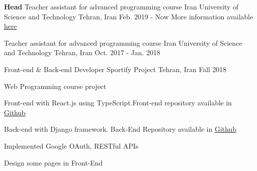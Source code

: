 

\begin{cventries}

  \cventry
  {\textbf{Head} Teacher assistant for advanced programming course} %
  {Iran University of Science and Technology} %
  {Tehran, Iran} %
  {Feb. 2019 - Now} %
  {More information available \textcolor{blue}{\href{https://sauleh.github.io/ap97/}{here}}}

  \cventry
  {Teacher assistant for advanced programming course} %
  {Iran University of Science and Technology} %
  {Tehran, Iran} %
  {Oct. 2017 - Jan. 2018} %
  {}

  \cventry
  {Front-end \& Back-end Developer} %
  {Sportify Project} %
  {Tehran, Iran} %
  {Fall 2018} %
  {
    \begin{cvitems} %
      \item {Web Programming course project}
      \item {Front-end with React.js using TypeScript.Front-end repository available in \href{https://github.com/ali4heydari/sportify-frontend}{Github}}
      \item {Back-end with Django framework. Back-End Repository available in \href{https://github.com/ali4heydari/sportify-backend}{Github}}
      \item {Implemented Google OAuth, RESTful APIs}
      \item {Design some pages in Front-End}
    \end{cvitems}
  }
  


\end{cventries}
